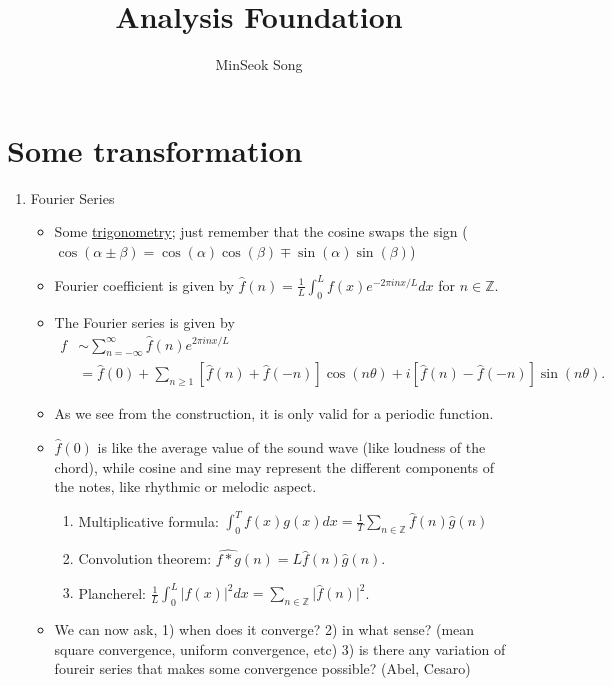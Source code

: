 \documentclass[11pt,reqno]{amsart}
\title{Analysis Foundation}
\author{MinSeok Song}
\date{}
\theoremstyle{remark}
\begin{document}
\maketitle
\tableofcontents
\section{Some transformation}
\begin{enumerate}
\item Fourier Series
\begin{itemize}
\item Some \href{https://www.eeweb.com/tools/trigonometry-laws-and-identities-sheet/}{trigonometry};
 just remember that the cosine swaps the sign ($\cos(\alpha \pm\beta)=\cos(\alpha)\cos(\beta)\mp \sin(\alpha)\sin(\beta)$)
\item Fourier coefficient is given by $\hat f(n)=\frac 1L\int^L_0 f(x)e^{-2\pi inx/L}dx$ for $n\in\mathbb{Z}$.
\item The Fourier series is given by
\begin{equation}
\begin{aligned}
f &\sim \sum_{n = -\infty}^{\infty} \hat{f}(n) e^{2\pi i n x / L} \\
&= \hat{f}(0) + \sum_{n \geq 1} [\hat{f}(n) + \hat{f}(-n)]\cos (n\theta) + i[\hat{f}(n) - \hat{f}(-n)]\sin(n\theta).
\end{aligned}
\end{equation}
\item As we see from the construction, it is only valid for a periodic function.
\item $\hat f(0)$ is like the average value of the sound wave (like loudness of the chord), while cosine and sine
 may represent the different components of the notes, like rhythmic or melodic aspect.
\begin{enumerate}
\item Multiplicative formula: $\int^T_0 f(x)g(x)dx=\frac 1T\sum\limits_{n\in\mathbb{Z}}\hat f(n)\hat g(n)$
\item Convolution theorem: $\widehat{f * g}(n)=L\hat f(n)\hat g(n)$.
\item Plancherel: $\frac 1L\int^L_0\lvert f(x)\rvert^2dx=\sum\limits_{n\in\mathbb{Z}}\lvert \hat f(n)\rvert^2$.
\end{enumerate}
\item We can now ask, 1) when does it converge? 2) in what sense? (mean square convergence, uniform convergence, etc) 3) is there any variation of foureir series that makes some convergence possible? (Abel, Cesaro)

\end{itemize}
\end{enumerate}
\end{document}

